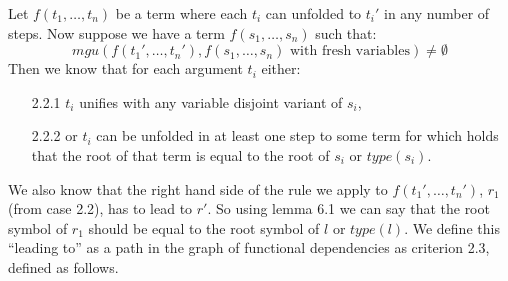 Let $f(t_1, \dots, t_n)$ be a term where each $t_i$ can unfolded to $t_i'$ in any number of steps. Now suppose we have a term $f(s_1, \dots, s_n)$ such that:
\[
\textit{mgu}(f(t_1', \dots, t_n'), f(s_1, \dots, s_n) \text{ with fresh variables}) \neq \emptyset
\]
Then we know that for each argument $t_i$ either:
\begin{enumerate}
    \itemsep 0em
    \item[2.2.1] $t_i$ unifies with any variable disjoint variant of $s_i$, 
    \item[2.2.2] or $t_i$ can be unfolded in at least one step to some term for which holds that the root of that term is equal to the root of $s_i$ or $\textit{type}(s_i)$. 
\end{enumerate}  

We also know that the right hand side of the rule we apply to $f(t_1', \dots, t_n')$, $r_1$ (from case 2.2), has to lead to $r'$. So using lemma 6.1 we can say that the root symbol of $r_1$ should be equal to the root symbol of $l$ or $\textit{type}(l)$. We define this ``leading to'' as a path in the graph of functional dependencies as criterion 2.3, defined as follows. 

